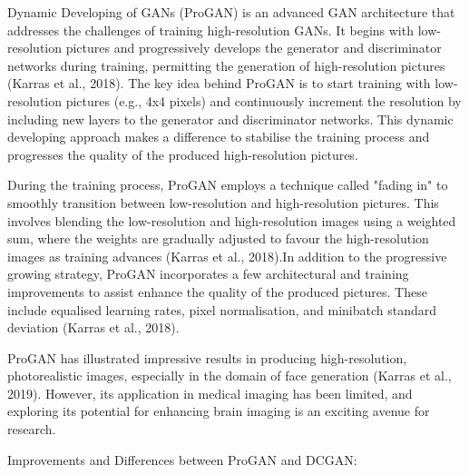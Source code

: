 \documentclass[
]{article}
\begin{document}
Dynamic Developing of GANs (ProGAN) is an advanced GAN architecture that
addresses the challenges of training high-resolution GANs. It begins
with low-resolution pictures and progressively develops the generator
and discriminator networks during training, permitting the generation of
high-resolution pictures (Karras et al., 2018). The key idea behind
ProGAN is to start training with low-resolution pictures (e.g., 4x4
pixels) and continuously increment the resolution by including new
layers to the generator and discriminator networks. This dynamic
developing approach makes a difference to stabilise the training process
and progresses the quality of the produced high-resolution pictures.

During the training process, ProGAN employs a technique called "fading
in" to smoothly transition between low-resolution and high-resolution
pictures. This involves blending the low-resolution and high-resolution
images using a weighted sum, where the weights are gradually adjusted to
favour the high-resolution images as training advances (Karras et al.,
2018).In addition to the progressive growing strategy, ProGAN
incorporates a few architectural and training improvements to assist
enhance the quality of the produced pictures. These include equalised
learning rates, pixel normalisation, and minibatch standard deviation
(Karras et al., 2018).

ProGAN has illustrated impressive results in producing high-resolution,
photorealistic images, especially in the domain of face generation
(Karras et al., 2019). However, its application in medical imaging has
been limited, and exploring its potential for enhancing brain imaging is
an exciting avenue for research.

Improvements and Differences between ProGAN and DCGAN:
\end{document}
